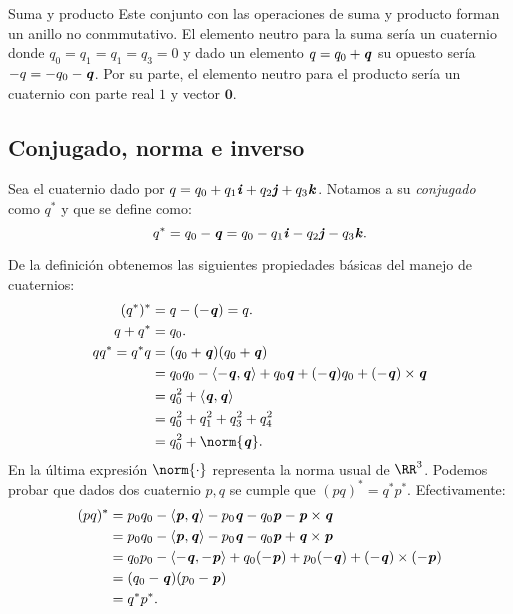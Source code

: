 \begin{subsection}{Suma y producto}
			Este conjunto con las operaciones de suma y producto forman un anillo no conmmutativo. El elemento neutro para la suma sería un cuaternio donde $ q_0 = q_1 = q_1 = q_3 = 0 $ y dado un elemento $  q = q_0 + \textbf{\emph{q}} $ su opuesto sería $ -q = -q_0-\textbf{\emph{q}}  $. Por su parte, el elemento neutro para el producto sería un cuaternio con parte real $ 1 $ y vector $ \mathbf{0} $.
		\end{subsection}
	
		\subsection{Conjugado, norma e inverso}
			Sea el cuaternio dado por $ q = q_0 + q_1 \textbf{\emph{i}} + q_2 \textbf{\emph{j}} + q_3 \textbf{\emph{k}} $. Notamos a su \textit{conjugado} como $ q^* $ y que se define como:
			\[
			q^* = q_0 - \textbf{\emph{q}} = q_0 - q_1 \textbf{\emph{i}} - q_2 \textbf{\emph{j}} - q_3 \textbf{\emph{k}}.
			\]
			
			De la definición obtenemos las siguientes propiedades básicas del manejo de cuaternios:
			\begin{equation*}
			\begin{split}
			(q^*)^* &= q - (-\qq) = q.\\
			q + q^* &= q_0.\\
			 q q^*= q^*q & = (q_0+\qq)(q_0+\qq) \\
			&= q_0q_0 - \langle-\qq, \qq \rangle + q_0\qq + (-\qq)q_0 + (-\qq) \times \qq \\
			&= q_0^2 + \langle\qq , \qq \rangle\\
			&= q_0^2 + q_1^2 + q_3^2 + q_4^2 \\
			& = q_0^2 + \norm{\qq}.
			\end{split}
			\end{equation*}
			En la última expresión $ \norm{\cdot} $ representa la norma usual de $ \RR^3 $. Podemos probar que dados dos cuaternio $ p,q $ se cumple que $ (pq)^* = q^*p^* $. Efectivamente:
			\begin{equation*}
			\begin{split}
			(pq)^* &= p_0q_0 - \langle \textbf{\emph{p}} , \textbf{\emph{q}} \rangle - p_0\textbf{\emph{q}} - q_0\textbf{\emph{p}} - \textbf{\emph{p}} \times \textbf{\emph{q}} \\
			 &= p_0q_0 - \langle \textbf{\emph{p}} , \textbf{\emph{q}} \rangle - p_0\textbf{\emph{q}} - q_0\textbf{\emph{p}} + \textbf{\emph{q}} \times \textbf{\emph{p}} \\
			 &= q_0p_0 - \langle -\textbf{\emph{q}} , -\textbf{\emph{p}} \rangle + q_0(-\textbf{\emph{p}})+p_0(-\textbf{\emph{q}}) + (-\textbf{\emph{q}}) \times (-\textbf{\emph{p}})\\
			 &= (q_0-\textbf{\emph{q}})(p_0-\textbf{\emph{p}})\\
			 &= q^* p^*.
			\end{split}
			\end{equation*}
			
